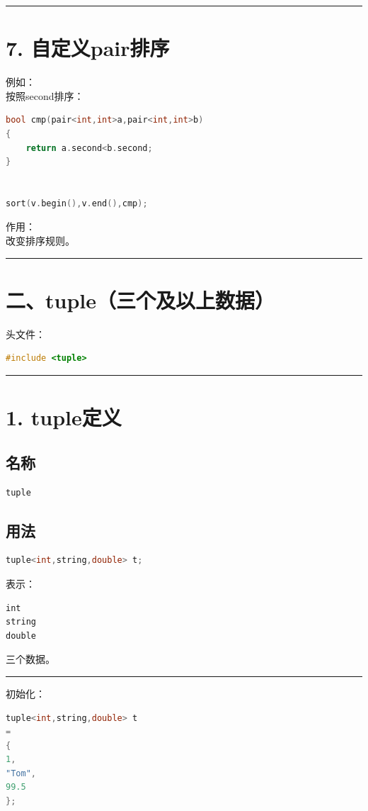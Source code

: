 \documentclass[9pt,twocolumn]{extarticle}
\begin{document}
\noindent\rule{\linewidth}{0.4pt}

\section{7. 自定义pair排序}

例如：\\
按照second排序：
\begin{lstlisting}[language=C++]
bool cmp(pair<int,int>a,pair<int,int>b)
{
    return a.second<b.second;
}


sort(v.begin(),v.end(),cmp);
\end{lstlisting}
作用：\\
改变排序规则。

\noindent\rule{\linewidth}{0.4pt}

\section{二、tuple（三个及以上数据）}

头文件：
\begin{lstlisting}[language=C++]
#include <tuple>
\end{lstlisting}

\noindent\rule{\linewidth}{0.4pt}

\section{1. tuple定义}

\subsection{名称}
\begin{lstlisting}[language=C++]
tuple
\end{lstlisting}

\subsection{用法}
\begin{lstlisting}[language=C++]
tuple<int,string,double> t;
\end{lstlisting}
表示：
\begin{lstlisting}
int
string
double
\end{lstlisting}
三个数据。

\noindent\rule{\linewidth}{0.4pt}

初始化：
\begin{lstlisting}[language=C++]
tuple<int,string,double> t
=
{
1,
"Tom",
99.5
};
\end{lstlisting}
\end{document}
